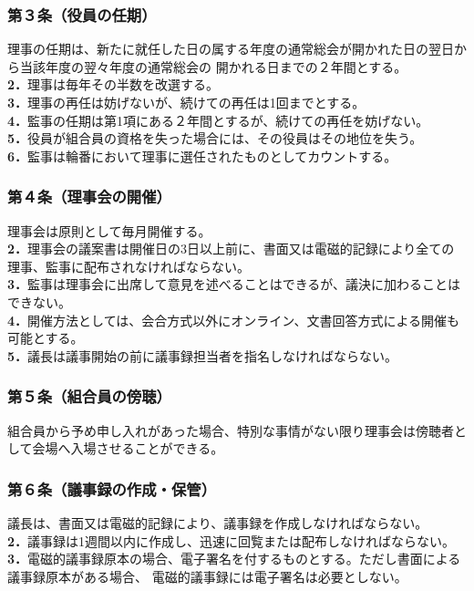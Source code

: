 \documentclass[12pt,uplatex]{jsarticle}
\begin{document}
\subsubsection*{ 第３条（役員の任期）}
理事の任期は、新たに就任した日の属する年度の通常総会が開かれた日の翌日から当該年度の翌々年度の通常総会の
開かれる日までの２年間とする。\\
\textbf{2．}理事は毎年その半数を改選する。\\
\textbf{3．}理事の再任は妨げないが、続けての再任は1回までとする。\\
\textbf{4．}監事の任期は第1項にある２年間とするが、続けての再任を妨げない。\\
\textbf{5．}役員が組合員の資格を失った場合には、その役員はその地位を失う。\\
\textbf{6．}監事は輪番において理事に選任されたものとしてカウントする。\\
\subsubsection*{ 第４条（理事会の開催）}
理事会は原則として毎月開催する。\\
\textbf{2．}理事会の議案書は開催日の3日以上前に、書面又は電磁的記録により全ての理事、監事に配布されなければならない。\\
\textbf{3．}監事は理事会に出席して意見を述べることはできるが、議決に加わることはできない。\\
\textbf{4．}開催方法としては、会合方式以外にオンライン、文書回答方式による開催も可能とする。\\
\textbf{5．}議長は議事開始の前に議事録担当者を指名しなければならない。\\
\subsubsection*{ 第５条（組合員の傍聴）}
組合員から予め申し入れがあった場合、特別な事情がない限り理事会は傍聴者として会場へ入場させることができる。
\subsubsection*{ 第６条（議事録の作成・保管）}
議長は、書面又は電磁的記録により、議事録を作成しなければならない。\\
\textbf{2．}議事録は1週間以内に作成し、迅速に回覧または配布しなければならない。\\
\textbf{3．}電磁的議事録原本の場合、電子署名を付するものとする。ただし書面による議事録原本がある場合、
電磁的議事録には電子署名は必要としない。\\
\end{document}
